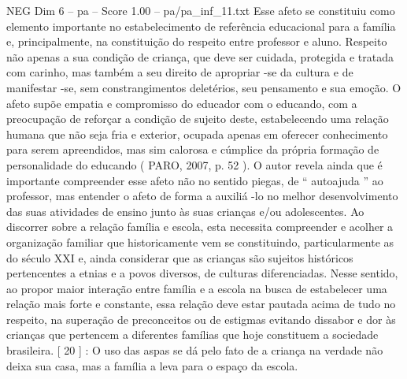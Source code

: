 \begin{textsample}{NEG Dim 6 – pa – Score 1.00 – pa/pa\_inf\_11.txt}
Esse afeto se constituiu como elemento importante no estabelecimento de referência educacional para a família e, principalmente, na constituição do respeito entre professor e aluno.
Respeito não apenas a sua condição de criança, que deve ser cuidada, protegida e tratada com carinho, mas também a seu direito de apropriar -se da cultura e de manifestar -se, sem constrangimentos deletérios, seu pensamento e sua emoção.
O afeto supõe empatia e compromisso do educador com o educando, com a preocupação de reforçar a condição de sujeito deste, estabelecendo uma relação humana que não seja fria e exterior, ocupada apenas em oferecer conhecimento para serem apreendidos, mas sim calorosa e cúmplice da própria formação de personalidade do educando ( PARO, 2007, p. 52 ).
O autor revela ainda que é importante compreender esse afeto não no sentido piegas, de “ autoajuda ” ao professor, mas entender o afeto de forma a auxiliá -lo no melhor desenvolvimento das suas atividades de ensino junto às suas crianças e/ou adolescentes.
Ao discorrer sobre a relação família e escola, esta necessita compreender e acolher a organização familiar que historicamente vem se constituindo, particularmente as do século XXI e, ainda considerar que as crianças são sujeitos históricos pertencentes a etnias e a povos diversos, de culturas diferenciadas.
Nesse sentido, ao propor maior interação entre família e a escola na busca de estabelecer uma relação mais forte e constante, essa relação deve estar pautada acima de tudo no respeito, na superação de preconceitos ou de estigmas evitando dissabor e dor às crianças que pertencem a diferentes famílias que hoje constituem a sociedade brasileira. [ 20 ] : O uso das aspas se dá pelo fato de a criança na verdade não deixa sua casa, mas a família a leva para o espaço da escola.

\end{textsample}
